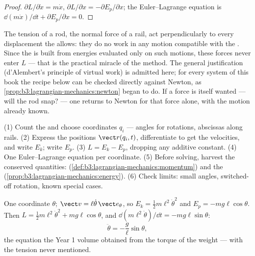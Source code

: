 \begin{proof}
$\partial L/\partial\dot x = m\dot x$, $\partial L/\partial x =
-\partial E_p/\partial x$; the Euler--Lagrange equation is
$\dd(m\dot x)/\dd t + \partial E_p/\partial x = 0$.
\end{proof}

\begin{remark}\label{rem:b3:lagrangian-mechanics:constraints}
The tension of a rod, the normal force of a rail, act perpendicularly
to every displacement the  allows: they do no work in any
motion compatible with the . Since the  is built from
energies evaluated only on such motions, these forces never enter $L$
--- that is the practical miracle of the method. The general
justification (d'Alembert's principle of virtual work) is admitted
here; for every system of this book the recipe below can be checked
directly against Newton, as \cref{prop:b3:lagrangian-mechanics:newton}
began to do. If a  force is itself wanted --- will the rod
snap? --- one returns to Newton for that force alone, with the motion
already known.
\end{remark}

\begin{method}\label{met:b3:lagrangian-mechanics:recipe}
(1) Count the  and choose coordinates $q_i$ ---
angles for rotations, abscissas along rails. (2) Express the positions
$\vect r(q_i, t)$, differentiate to get the velocities, and write
$E_k$; write $E_p$. (3) $L = E_k - E_p$, dropping any additive
constant. (4) One Euler--Lagrange equation per coordinate. (5) Before
solving, harvest the conserved quantities: 
(\cref{def:b3:lagrangian-mechanics:momentum}) and the 
(\cref{prop:b3:lagrangian-mechanics:energy}). (6) Check limits: small
angles, switched-off rotation, known special cases.
\end{method}

\begin{example}\label{ex:b3:lagrangian-mechanics:pendulum}
One coordinate $\theta$; $\vect v = \ell\dot\theta\,\vect e_\theta$, so
$E_k = \tfrac12 m\ell^2\dot\theta^2$ and $E_p = -mg\ell\cos\theta$.
Then $L = \tfrac12 m\ell^2\dot\theta^2 + mg\ell\cos\theta$, and
$\dd(m\ell^2\dot\theta)/\dd t = -mg\ell\sin\theta$:
\[
\ddot\theta = -\frac{g}{\ell}\sin\theta ,
\]
the equation the Year 1 volume obtained from the torque of the weight
--- with the tension never mentioned.
\end{example}

